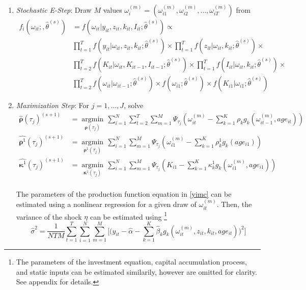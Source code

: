\documentclass{article}
\begin{document}
\begin{enumerate}
    \item \textit{Stochastic E-Step}: Draw $M$ values $\omega_{i}^{(m)}=(\omega_{i1}^{(m)}, \omega_{i2}^{(m)},\dots, \omega_{iT}^{(m)})$ from
        \begin{equation*}
        \begin{split}
            f_{i}(\omega_{it};,\hat{\theta}^{(s)})&=f(\omega_{it}|y_{it}, z_{it}, k_{it}, I_{it}; \hat{\theta}^{(s)}) \propto\\
            &\prod_{t=1}^{T}f(y_{it}|\omega_{it}, z_{it}, k_{it};\hat{\theta}^{(s)})\times
            \prod_{t=1}^{T}f(z_{it}|\omega_{it}, k_{it};\hat{\theta}^{(s)})\times\\
            &\prod_{t=2}^{T}f(K_{it}|\omega_{it}, K_{it-1}, I_{it-1};\hat{\theta}^{(s)})\times \prod_{t=1}^{T}f(I_{it}|\omega_{it}, k_{it}; \hat{\theta}^{(s)})\times \\
            &\prod_{t=2}^{T}f(\omega_{it}|\omega_{it-1};\hat{\theta}^{(s)})\times f(\omega_{i1};\hat{\theta}^{(s)})\times f(K_{i1}|\omega_{i1};\hat{\theta}^{(s)})
            \end{split}
        \end{equation*}
    \item \textit{Maximization Step}: For $j=1,\dots, J$, solve
    \begin{equation*}
    \begin{split}
    \hat{\boldsymbol\rho}(\tau_{j})^{(s+1)}&=\underset{\boldsymbol\rho(\tau_{j})}{\operatorname{argmin}}\,\sum_{i=1}^{N}\sum_{t=2}^{T}\sum_{m=1}^{M}\Psi_{\tau_{j}}(\omega_{it}^{(m)}-\sum_{k=1}^{K}\rho_{k}g_{k}(\omega_{it-1}^{(m)}, age_{it}))\\
    \hat{\boldsymbol\rho^{1}}(\tau_{j})^{(s+1)}&=\underset{\boldsymbol\rho^{1}(\tau_{j})}{\operatorname{argmin}}\,\sum_{i=1}^{N}\sum_{m=1}^{M}\Psi_{\tau_{j}}(\omega_{i1}^{(m)}-\sum_{k=1}^{K}\rho_{k}^{1}g_{k}(age_{i1}))\\
    \hat{\boldsymbol\kappa^{1}}(\tau_{j})^{(s+1)}&=\underset{\boldsymbol\kappa^{1}(\tau_{j})}{\operatorname{argmin}}\,\sum_{i=1}^{N}\sum_{m=1}^{M}\Psi_{\tau_{j}}(K_{i1}-\sum_{k=1}^{K}\kappa_{k}^{1}g_{k}(\omega_{i1}^{(m)}, age_{i1}))\\
    \end{split}
    \end{equation*}
    
    The parameters of the production function equation in \eqref{yimc} can be estimated using a nonlinear regression for a given draw of $\omega_{it}^{(m)}$. Then, the variance of the shock $\eta$ can be estimated using \footnote{The parameters of the investment equation, capital accumulation process, and static inputs can be estimated similarily, however are omitted for clarity. See appendix for details.}
     \begin{equation}\label{staticyvar}
     \hat{\sigma}^{2}=\frac{1}{NTM}\sum_{t=1}^{T}\sum_{i=1}^{N}\sum_{m=1}^{M}\Bigg[\Bigg(y_{it}-\hat{\alpha}-\sum_{k=1}^{K}\hat{\beta}_{k}g_{k}(\omega_{it}^{(m)}, z_{it}, k_{it}, age_{it})\Bigg)^{2}\Bigg]
     \end{equation}
\end{enumerate}

\pagebreak
\newpage



\end{document}
